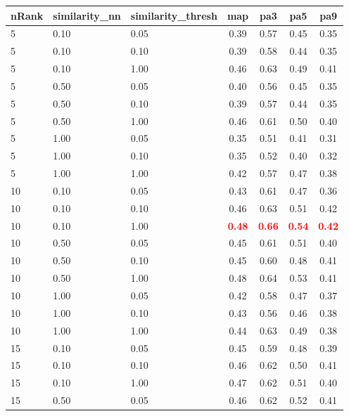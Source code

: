\documentclass[12pt,a4paper,fleqn]{tufte-handout}
\begin{document}
 
\begin{table}          
\begin{center}          
\scriptsize          
\setlength{\tabcolsep}{.16667em}          
\begin{tabular}{lllcccc}          
nRank & similarity\_nn & similarity\_thresh & map & pa3 & pa5 & pa9 \\          
\hline          
5 & 0.10 & 0.05 & 0.39 & 0.57 & 0.45 & 0.35 \\          
5 & 0.10 & 0.10 & 0.39 & 0.58 & 0.44 & 0.35 \\          
5 & 0.10 & 1.00 & 0.46 & 0.63 & 0.49 & 0.41 \\          
5 & 0.50 & 0.05 & 0.40 & 0.56 & 0.45 & 0.35 \\          
5 & 0.50 & 0.10 & 0.39 & 0.57 & 0.44 & 0.35 \\          
5 & 0.50 & 1.00 & 0.46 & 0.61 & 0.50 & 0.40 \\          
5 & 1.00 & 0.05 & 0.35 & 0.51 & 0.41 & 0.31 \\          
5 & 1.00 & 0.10 & 0.35 & 0.52 & 0.40 & 0.32 \\          
5 & 1.00 & 1.00 & 0.42 & 0.57 & 0.47 & 0.38 \\          
10 & 0.10 & 0.05 & 0.43 & 0.61 & 0.47 & 0.36 \\          
10 & 0.10 & 0.10 & 0.46 & 0.63 & 0.51 & 0.42 \\          
10 & 0.10 & 1.00 & \textbf{\textcolor{red}{0.48}} & \textbf{\textcolor{red}{0.66}} & \textbf{\textcolor{red}{0.54}} & \textbf{\textcolor{red}{0.42}} \\          
10 & 0.50 & 0.05 & 0.45 & 0.61 & 0.51 & 0.40 \\          
10 & 0.50 & 0.10 & 0.45 & 0.60 & 0.48 & 0.41 \\          
10 & 0.50 & 1.00 & 0.48 & 0.64 & 0.53 & 0.41 \\          
10 & 1.00 & 0.05 & 0.42 & 0.58 & 0.47 & 0.37 \\          
10 & 1.00 & 0.10 & 0.43 & 0.56 & 0.46 & 0.38 \\          
10 & 1.00 & 1.00 & 0.44 & 0.63 & 0.49 & 0.38 \\          
15 & 0.10 & 0.05 & 0.45 & 0.59 & 0.48 & 0.39 \\          
15 & 0.10 & 0.10 & 0.46 & 0.62 & 0.50 & 0.41 \\          
15 & 0.10 & 1.00 & 0.47 & 0.62 & 0.51 & 0.40 \\          
15 & 0.50 & 0.05 & 0.46 & 0.62 & 0.52 & 0.41 \\          

\end{tabular}
\end{center}
\end{table}
\end{document}
